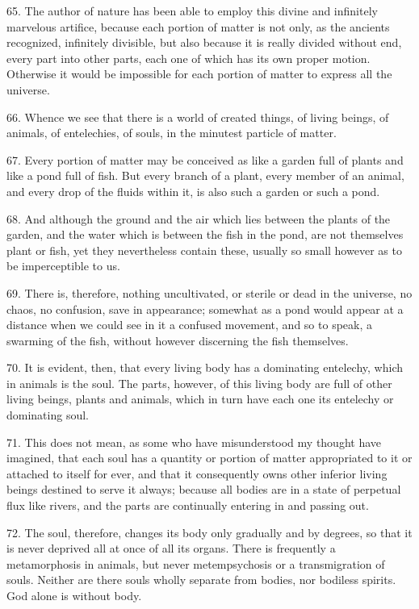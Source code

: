 65. The author of nature has been able to employ this divine and
infinitely marvelous artifice, because each portion of matter is not
only, as the ancients  rec\-og\-nized, infinitely divisible,
but also because it is really divided without end, every part into
other parts, each one of which has its own proper motion. Otherwise it
would be impossible for each portion of matter to express all the
universe.

66. Whence we see that there is a world of created things, of living
beings, of animals, of entelechies, of souls, in the minutest particle
of matter.

67. Every portion of matter may be conceived as like a garden full of
plants and like a pond full of fish. But every branch of a plant,
every member of an animal, and every drop of the fluids within it, is
also such a garden or such a pond.

68. And although the ground and the air which lies between the plants
of the garden, and the water which is between the fish in the pond,
are not themselves plant or fish, yet they nevertheless contain these,
usually so small however as to be imperceptible to us.

69. There is, therefore, nothing uncultivated, or sterile or dead in
the universe, no chaos, no confusion, save in appearance; somewhat as
a pond would appear at a distance when we could see in it a confused
movement, and so to speak, a swarming of the fish, without however
discerning the fish themselves.

70. It is evident, then, that every living body has a dominating
entelechy, which in animals is the soul. The parts, however, of this
living body are full of other living beings, plants and animals, which
in turn have each one its entelechy or dominating soul.

71. This does not mean, as some who have misunderstood my thought have
imagined, that each soul has a quantity or portion of matter
appropriated to it or attached to itself for ever, and that it
consequently  owns other inferior living beings destined to
serve it always; because all bodies are in a state of perpetual flux
like rivers, and the parts are continually entering in and passing
out.

72. The soul, therefore, changes its body only gradually and by
degrees, so that it is never deprived all at once of all its organs.
There is frequently a metamorphosis in animals, but never
metempsychosis or a transmigration of souls. Neither are there souls
wholly separate from bodies, nor bodiless spirits. God alone is
without body.

